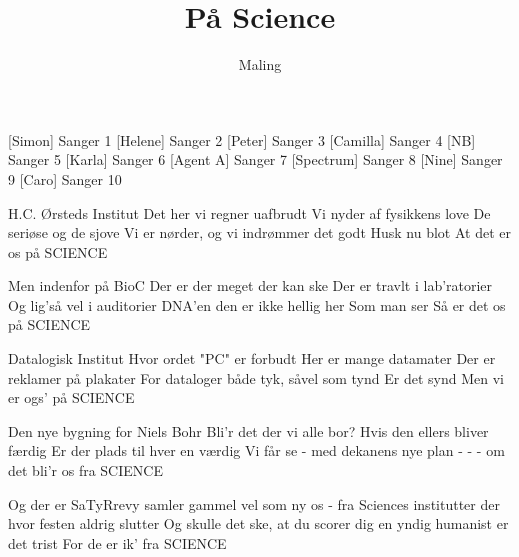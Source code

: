 \documentclass[a4paper,11pt]{article}
\title{På Science}
\author{Maling}
\begin{document}
\maketitle

\begin{roles}
[Simon] Sanger 1
[Helene] Sanger 2
[Peter] Sanger 3
[Camilla] Sanger 4
[NB] Sanger 5
[Karla] Sanger 6
[Agent A] Sanger 7
[Spectrum] Sanger 8
[Nine] Sanger 9
[Caro] Sanger 10
\end{roles}

\begin{song}

 H.C. Ørsteds Institut
Det her vi regner uafbrudt
Vi nyder af fysikkens love
De seriøse og de sjove
Vi er nørder, og vi indrømmer det godt
Husk nu blot
At det er os på SCIENCE

 Men indenfor på BioC
Der er der meget der kan ske
Der er travlt i lab’ratorier
Og lig’så vel i auditorier
DNA’en den er ikke hellig her
Som man ser
Så er det os på SCIENCE

 Datalogisk Institut
Hvor ordet "PC" er forbudt
Her er mange datamater
Der er reklamer på plakater
For dataloger både tyk, såvel som tynd
Er det synd
Men vi er ogs' på SCIENCE

 Den nye bygning for Niels Bohr
Bli'r det der vi alle bor?
Hvis den ellers bliver færdig
Er der plads til hver en værdig
Vi får se - med dekanens nye plan
- - -
om det bli'r os fra SCIENCE

 Og der er SaTyRrevy
samler gammel vel som ny
os - fra Sciences institutter
der hvor festen aldrig slutter
Og skulle det ske, at du scorer dig en yndig humanist
er det trist
For de er ik' fra SCIENCE

\end{song}
\end{document}
